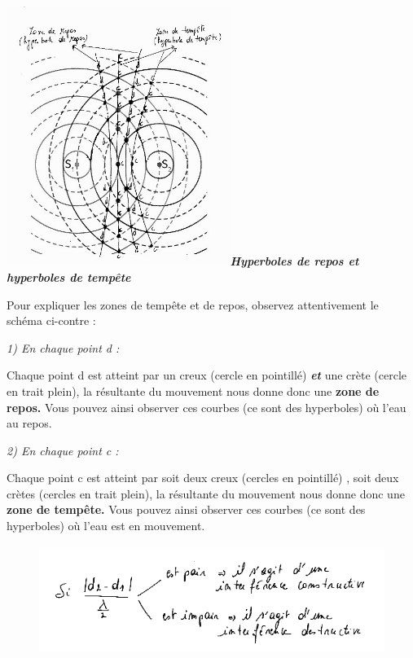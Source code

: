{\emph{\textbf{ }}

\includegraphics[width=7.264cm,height=8.423cm]{Pictures/100000010000021B000002719784CD0CAF081F55.png}\emph{\textbf{Hyperboles
de repos et hyperboles de tempête}}

Pour expliquer les zones de tempête et de repos, observez attentivement
le schéma ci-contre :

\emph{1) En chaque point d :}

Chaque point d est atteint par un creux (cercle en pointillé)
\emph{\textbf{et}} une crète (cercle en trait plein), la résultante du
mouvement nous donne donc une \textbf{zone de repos.} Vous pouvez ainsi
observer ces courbes (ce sont des hyperboles) où l'eau au repos.

\emph{2) En chaque point c : }

Chaque point c est atteint par soit deux creux (cercles en pointillé) ,
soit deux crètes (cercles en trait plein), la résultante du mouvement
nous donne donc une \textbf{zone de tempête.} Vous pouvez ainsi observer
ces courbes (ce sont des hyperboles) où l'eau est en mouvement.

\begin{figure}
\centering
\includegraphics[width=13.005cm,height=3.542cm]{Pictures/1000000100000220000000A31734CD7DA5F285B4.png}
\caption{}
\end{figure}

}
